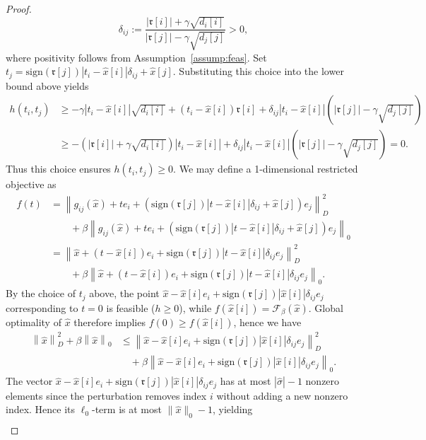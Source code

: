 \documentclass[11pt]{article}
\theoremstyle{plain}
\theoremstyle{definition}
\theoremstyle{plain}
\newcommand{\norm}[1]{\left\lVert#1\right\rVert}
\newcommand{\abs}[1]{\left\lvert#1\right\rvert}
\newcommand{\cF}{{\mathcal F}}
\newcommand{\ccr}{{\mathfrak r}}
\begin{document}
\begin{proof}
\[     \delta_{ij}:=\frac{\abs{\ccr[i]}+\gamma\sqrt{d_i[i]}}{\abs{\ccr[j]}-\gamma\sqrt{d_j[j]}} >0,
    \]
    where positivity follows from Assumption~\ref{assump:feas}.
     Set $t_j=\mathrm{sign}(\ccr[j])\abs{t_i-\hat{x}[i]}\delta_{ij}+\hat{x}[j]$. Substituting this choice into the lower bound above yields
    \begin{align*}
        h(t_i,t_j)&\geq -\gamma\abs{t_i-\hat{x}[i]}\sqrt{d_i[i]}+(t_i-\hat{x}[i])\ccr[i]+\delta_{ij}\abs{t_i-\hat{x}[i]}(\abs{\ccr[j]}-\gamma\sqrt{d_j[j]})\\
        &\geq -(\abs{\ccr[i]}+\gamma\sqrt{d_i[i]})\abs{t_i-\hat{x}[i]}+\delta_{ij}\abs{t_i-\hat{x}[i]}(\abs{\ccr[j]}-\gamma\sqrt{d_j[j]})=0.
    \end{align*}
    Thus this choice ensures $h(t_i,t_j)\geq 0$. We may define a 1-dimensional restricted objective as
    \begin{align*}
        f(t)&=\norm{g_{ij}(\hat{x})+te_i+(\mathrm{sign}(\ccr[j])\abs{t-\hat{x}[i]}\delta_{ij}+\hat{x}[j])e_j}_D^2\\
        &\qquad +\beta \norm{g_{ij}(\hat{x})+te_i+(\mathrm{sign}(\ccr[j])\abs{t-\hat{x}[i]}\delta_{ij}+\hat{x}[j])e_j}_0\\
        &=\norm{\hat{x}+(t-\hat{x}[i])e_i+\mathrm{sign}(\ccr[j])\abs{t-\hat{x}[i]}\delta_{ij}e_j}_D^2\\
        &\qquad+\beta \norm{\hat{x}+(t-\hat{x}[i])e_i+\mathrm{sign}(\ccr[j])\abs{t-\hat{x}[i]}\delta_{ij}e_j}_0.
    \end{align*}
    By the choice of $t_j$ above, the point $\hat{x}-\hat{x}[i]e_i+\mathrm{sign}(\ccr[j])\abs{\hat{x}[i]}\delta_{ij}e_j$ corresponding to $t=0$ is feasible ($h\geq 0$), while $f(\hat{x}[i])=\cF_\beta(\hat{x})$. Global optimality of $\hat{x}$ therefore implies $f(0)\geq f(\hat{x}[i])$, hence we have
    \begin{align*}
        \norm{\hat{x}}_D^2+\beta\norm{\hat{x}}_0
        &\leq \norm{\hat{x}-\hat{x}[i]e_i+\mathrm{sign}(\ccr[j])\abs{\hat{x}[i]}\delta_{ij}e_j}_D^2\\
&\quad+\beta\norm{\hat{x}-\hat{x}[i]e_i+ \mathrm{sign}(\ccr[j])\abs{\hat{x}[i]}\delta_{ij}e_j}_0.
    \end{align*}
    The vector $\hat{x}-\hat{x}[i]e_i+\mathrm{sign}(\ccr[j])\abs{\hat{x}[i]}\delta_{ij}e_j$ has at most $\abs{\hat{\sigma}}-1$ nonzero elements since the perturbation removes index $i$ without adding a new nonzero index.  Hence its $\ell_0$-term is at most $\|\hat{x}\|_0-1$, yielding
\begin{align}\label{eq:betabound}

\end{align}
\end{proof}
\end{document}
